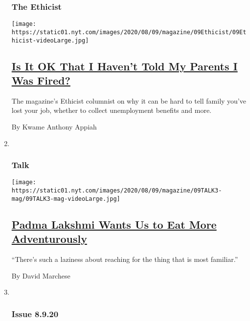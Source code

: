 \begin{enumerate}
{  \subsubsection{The Ethicist}\label{the-ethicist}}

  \texttt{[image: https://static01.nyt.com/images/2020/08/09/magazine/09Ethicist/09Ethicist-videoLarge.jpg]}

  \hypertarget{is-it-ok-that-i-havent-told-my-parents-i-was-fired}{%
  \subsection{\texorpdfstring{\href{/2020/08/04/magazine/jobs-unemployment-ethics.html}{Is
  It OK That I Haven't Told My Parents I Was
  Fired?}}{Is It OK That I Haven't Told My Parents I Was Fired?}}\label{is-it-ok-that-i-havent-told-my-parents-i-was-fired}}

  The magazine's Ethicist columnist on why it can be hard to tell family
  you've lost your job, whether to collect unemployment benefits and
  more.

  By Kwame Anthony Appiah
\item ~
  \hypertarget{talk}{%
  \subsubsection{Talk}\label{talk}}

  \texttt{[image: https://static01.nyt.com/images/2020/08/09/magazine/09TALK3-mag/09TALK3-mag-videoLarge.jpg]}

  \hypertarget{padma-lakshmi-wants-us-to-eat-more-adventurously}{%
  \subsection{\texorpdfstring{\href{/interactive/2020/08/03/magazine/padma-lakshmi-interview.html}{Padma
  Lakshmi Wants Us to Eat More
  Adventurously}}{Padma Lakshmi Wants Us to Eat More Adventurously}}\label{padma-lakshmi-wants-us-to-eat-more-adventurously}}

  ``There's such a laziness about reaching for the thing that is most
  familiar.''

  By David Marchese
\item ~
  \hypertarget{issue-8920}{%
  \subsubsection{Issue 8.9.20}\label{issue-8920}}


\end{enumerate}
